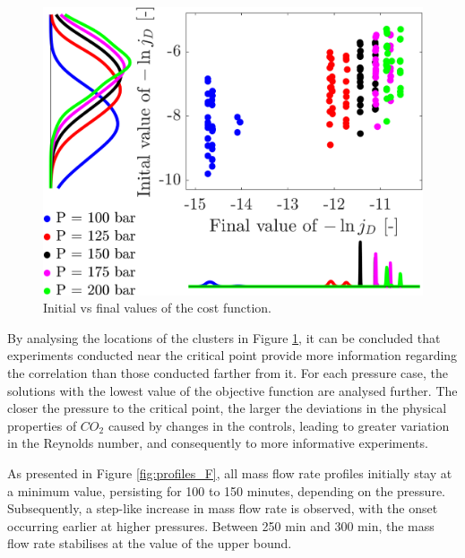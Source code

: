 \documentclass[a4paper,fleqn]{cas-dc}
\begin{document}
		\begin{figure}[h!]
			\centering
			\includegraphics[width=0.90\columnwidth]{Figures/Results/scatter.png}	
			\caption{Initial vs final values of the cost function.}
			\label{fig:scatter}
		\end{figure}
		
		By analysing the locations of the clusters in Figure \ref{fig:scatter}, it can be concluded that experiments conducted near the critical point provide more information regarding the correlation than those conducted farther from it. For each pressure case, the solutions with the lowest value of the objective function are analysed further. The closer the pressure to the critical point, the larger the deviations in the physical properties of $CO_2$ caused by changes in the controls, leading to greater variation in the Reynolds number, and consequently to more informative experiments. 
		
		As presented in Figure \ref{fig:profiles_F}, all mass flow rate profiles initially stay at a minimum value, persisting for 100 to 150 minutes, depending on the pressure. Subsequently, a step-like increase in mass flow rate is observed, with the onset occurring earlier at higher pressures. Between 250 min and 300 min, the mass flow rate stabilises at the value of the upper bound.
		
\end{document}
